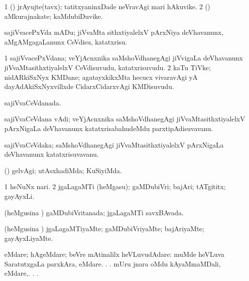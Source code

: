 {{{{{{{{{{{{\bentry
{} 
\gl{\nA}
\expl{}
\bmng
\bnum
\num{1} (\pArxvi) jrAyujte(tavx); tatitxyaninxDade neVravAgi mari hAkuvike. 
\num{2} (\savi) aMkurajnakate; kaMdubiDuvike. 
\enum
\emng
\eentry

\bentry
{} 
\gl{\akirx}
\expl{}
\bmng
 sajiVvacePxVda mADu; jiVvaMta sithxtiyalelxV pArxNiya deVhavanunx, aMgAMgagaLanunx CeVdisu, katatxrisu. 
\emng
\eentry

\bentry 
{} 
\gl{\nA}
\expl{}
\bmng
\bnum
\num{1} sajiVvacePxVdana; veYjAcnxnika saMshoVdhanegAgi jiVvigaLa deVhavanunx jiVvaMtasithxtiyalelxV CeVdisuvudu, katatxrisuvudu. 
\num{2} kaTu TiVke; nidARkiSxNyx KMDane; agatayxkikxMta hecucx vivaravAgi yA dayAdAkiSxNyxvillxde CidarxCidarxvAgi KMDisuvudu. 
\enum
\emng
\eentry

\bentry 
{} 
\gl{\gu}
\expl{}
\bmng
 sajiVvaCeVdanada. 
\emng
\eentry

\bentry 
{} 
\gl{\nA}
\expl{}
\bmng
 sajiVvaCeVdana vAdi; veYjAcnxnika saMshoVdhanegAgi jiVvaMtasithxtiyalelxV pArxNigaLa deVhavanunx katatxrisabahudeMdu parxtipAdisuvavanu. 
\emng
\eentry

\bentry
{} 
\gl{\nA}
\expl{}
\bmng
 sajiVvaCeVdaka; saMshoVdhanegAgi jiVvaMtasithxtiyalelxV pArxNigaLa deVhavanunx katatxrisuvavanu. 
\emng
\eentry

\bentry 
{} 
\gl{\kirxvi}
\expl{}
\bmng
 (\saM) gelvAgi; utAsxhadiMda; KuSiyiMda. 
\emng
\eentry

\bentry
{} 
\gl{\nA}
\expl{}
\bmng
\bnum
\num{1} heNuNx nari. 
\num{2} jgaLagaMTi (heMgasu); gaMDubiVri; bajAri; tATgititx; gayAyxLi. 
\enum
\emng
\eentry

\bentry
{} 
\gl{\gu}
\expl{}
\bmng
 (heMgusina \vi) gaMDubiVritanada; jgaLagaMTi savxBAvada. 
\emng
\eentry

\bentry 
{} 
\gl{\kirxvi}
\expl{}
\bmng
 (heMgusina \vi) jgaLagaMTiyaMte; gaMDubiVriyaMte; bajAriyaMte; gayAyxLiyaMte. 
\emng
\eentry

\bentry 
{} 
\gl{\kirxvi}
\expl{}
\bmng
 eMdare; hAgeMdare; beVre mAtinalilx heVLuvudAdare:  muMde heVLuva SaratutxgaLa parxkAra, eMdare. . .  mUru jnara oMdu kAyaMmaMDali, eMdare,. . . 
\emng
\eentry

}}}}}}}}}}}}
